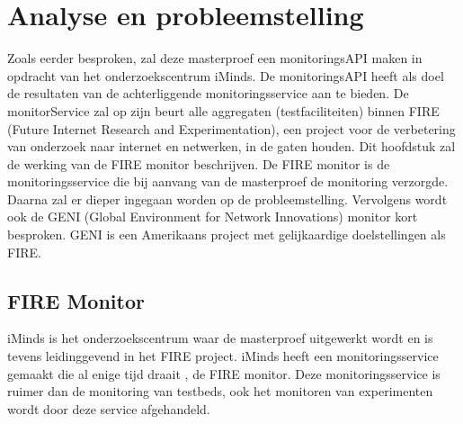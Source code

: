 \newpage
\chapter{Analyse en probleemstelling}
{\samenvatting
Zoals eerder besproken, zal deze masterproef een monitoringsAPI maken in opdracht van het onderzoekscentrum iMinds. De monitoringsAPI heeft als doel de resultaten van de achterliggende monitoringsservice aan te bieden. De monitorService zal op zijn beurt alle aggregaten (testfaciliteiten) binnen FIRE (Future Internet Research and Experimentation), een project voor de verbetering van onderzoek naar internet en netwerken, in de gaten houden. Dit hoofdstuk zal de werking van de FIRE monitor beschrijven. De FIRE monitor is de monitoringsservice die bij aanvang van de masterproef de monitoring verzorgde. Daarna zal er dieper ingegaan worden op de probleemstelling. Vervolgens wordt ook de GENI (Global Environment for Network Innovations) monitor kort besproken. GENI is een Amerikaans project met gelijkaardige doelstellingen als FIRE.}
\section{FIRE Monitor}
\npar
iMinds is het onderzoekscentrum waar de masterproef uitgewerkt wordt en is tevens leidinggevend in het FIRE project. iMinds heeft een monitoringsservice gemaakt die al enige tijd draait \citep{fed4fire-second-fed-arch}, de FIRE monitor. Deze monitoringsservice is ruimer dan de monitoring van testbeds, ook het monitoren van experimenten wordt door deze service afgehandeld\citep{fed4fire-second-fed-arch}. 
